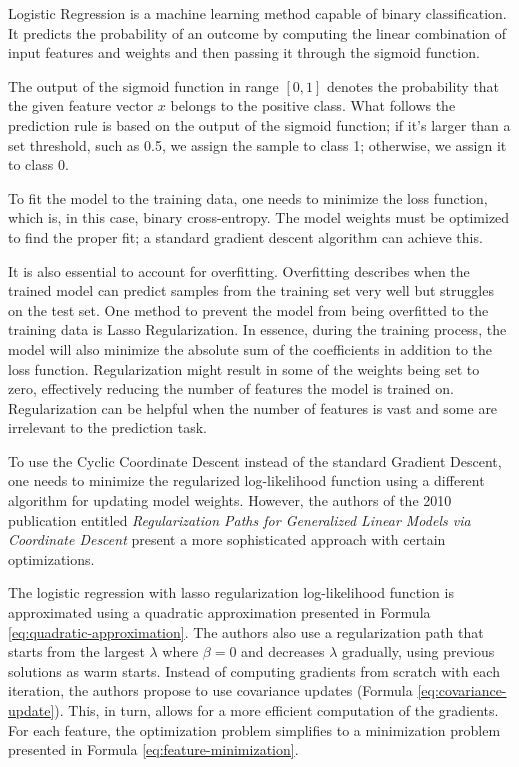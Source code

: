\documentclass[11pt]{article}
\begin{document}
Logistic Regression is a machine learning method capable of binary classification. It predicts the probability of an outcome by computing the linear combination of input features and weights and then passing it through the sigmoid function.

The output of the sigmoid function in range $[0,1]$ denotes the probability that the given feature vector $x$ belongs to the positive class. What follows the prediction rule is based on the output of the sigmoid function; if it's larger than a set threshold, such as 0.5, we assign the sample to class 1; otherwise, we assign it to class 0.

To fit the model to the training data, one needs to minimize the loss function, which is, in this case, binary cross-entropy. The model weights must be optimized to find the proper fit; a standard gradient descent algorithm can achieve this.

It is also essential to account for overfitting. Overfitting describes when the trained model can predict samples from the training set very well but struggles on the test set. One method to prevent the model from being overfitted to the training data is Lasso Regularization. In essence, during the training process, the model will also minimize the absolute sum of the coefficients in addition to the loss function. Regularization might result in some of the weights being set to zero, effectively reducing the number of features the model is trained on. Regularization can be helpful when the number of features is vast and some are irrelevant to the prediction task.

To use the Cyclic Coordinate Descent instead of the standard Gradient Descent, one needs to minimize the regularized log-likelihood function using a different algorithm for updating model weights. However, the authors of the 2010 publication entitled \textit{Regularization Paths for Generalized Linear Models via Coordinate Descent} \cite{Friedman2010} present a more sophisticated approach with certain optimizations.


The logistic regression with lasso regularization log-likelihood function is approximated using a quadratic approximation presented in Formula \ref{eq:quadratic-approximation}. The authors also use a regularization path that starts from the largest $\lambda$ where $\beta = 0$ and decreases $\lambda$ gradually, using previous solutions as warm starts. Instead of computing gradients from scratch with each iteration, the authors propose to use covariance updates (Formula \ref{eq:covariance-update}). This, in turn, allows for a more efficient computation of the gradients. For each feature, the optimization problem simplifies to a minimization problem presented in Formula \ref{eq:feature-minimization}.
\end{document}
